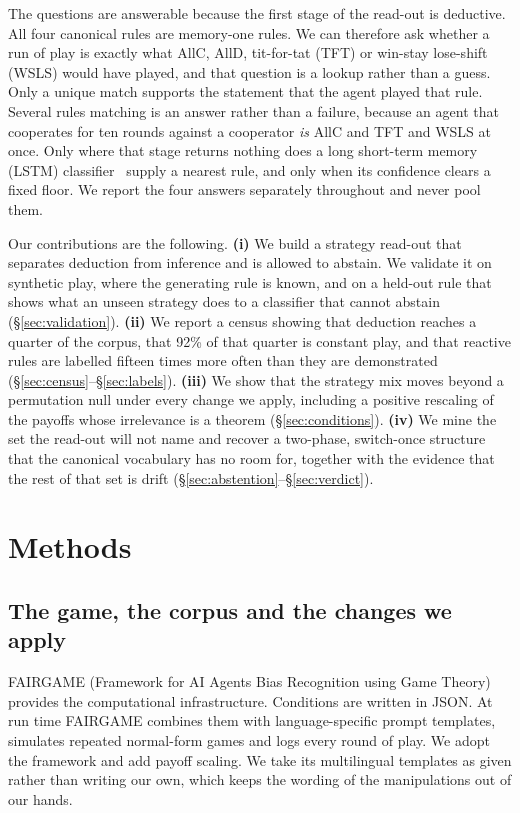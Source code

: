\documentclass[11pt,a4paper]{article}
\begin{document}
The questions are answerable because the first stage of the read-out is
deductive. All four canonical rules are memory-one rules. We can therefore ask
whether a run of play is exactly what AllC, AllD, tit-for-tat (TFT) or
win-stay lose-shift (WSLS) would have played, and that question is a lookup
rather than a guess. Only a unique match supports the statement that the agent
played that rule. Several rules matching is an answer rather than a failure,
because an agent that cooperates for ten rounds against a cooperator \emph{is}
AllC and TFT and WSLS at once. Only where that stage returns nothing does a
long short-term memory (LSTM) classifier~\citep{hochreiter1997long} supply a
nearest rule, and only when its confidence clears a fixed floor. We report the
four answers separately throughout and never pool them.

Our contributions are the following. \textbf{(i)} We build a strategy read-out
that separates deduction from inference and is allowed to abstain. We validate
it on synthetic play, where the generating rule is known, and on a held-out
rule that shows what an unseen strategy does to a classifier that cannot
abstain (\S\ref{sec:validation}). \textbf{(ii)} We report a census showing
that deduction reaches a quarter of the corpus, that 92\% of that quarter is
constant play, and that reactive rules are labelled fifteen times more often
than they are demonstrated (\S\ref{sec:census}--\S\ref{sec:labels}).
\textbf{(iii)} We show that the strategy mix moves beyond a permutation null
under every change we apply, including a positive rescaling of the payoffs
whose irrelevance is a theorem (\S\ref{sec:conditions}). \textbf{(iv)} We mine
the set the read-out will not name and recover a two-phase, switch-once
structure that the canonical vocabulary has no room for, together with the
evidence that the rest of that set is drift
(\S\ref{sec:abstention}--\S\ref{sec:verdict}).

\section{Methods}

\subsection{The game, the corpus and the changes we apply}
\label{sec:stage}

FAIRGAME (Framework for AI Agents Bias Recognition using Game
Theory)~\citep{fairgame2025} provides the computational infrastructure.
Conditions are written in JSON. At run time FAIRGAME combines them with
language-specific prompt templates, simulates repeated normal-form games and
logs every round of play. We adopt the framework and add payoff scaling. We
take its multilingual templates as given rather than writing our own, which
keeps the wording of the manipulations out of our hands.
\end{document}
